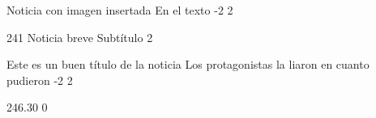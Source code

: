 
\begin{noticiacolmulti}{4}{0}{1}
	{Noticia con imagen insertada}
	{En el texto}
	{-2}	%
	{2}		%
	{}
	\noindent{}
	
\end{noticiacolmulti}

\begin{noticiacol1}{2}{4}{1}
	{Noticia breve}
	{Subtítulo}
	{2} %
	\small
	
\end{noticiacol1}

\begin{noticiacolmulti}{4}{0}{5.75}
	{Este es un buen título de la noticia}
	{Los protagonistas la liaron en cuanto pudieron}
	{-2}	%
	{2}		%
	{}
	
\end{noticiacolmulti}

\begin{cajacol1}{2}{4}{6.30}
	{}
	{}
	{0} %
	
\end{cajacol1}


